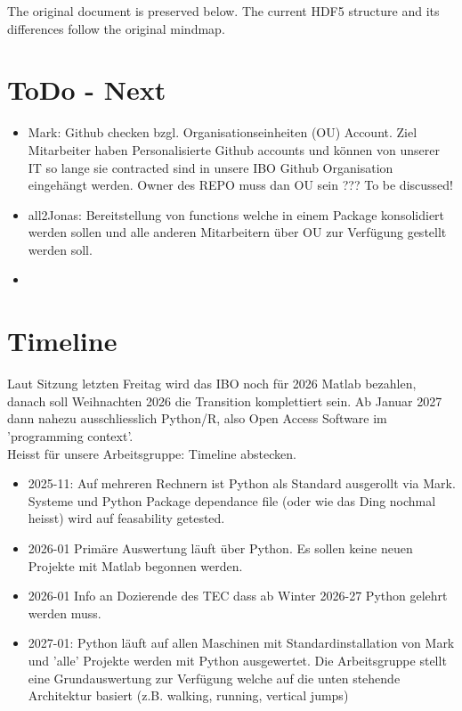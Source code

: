 \documentclass{article}
\begin{document}
The original document is preserved below. The current HDF5 structure and
its differences follow the original mindmap.




\section{ToDo - Next}
\begin{itemize}
    \item Mark: Github checken bzgl. Organisationseinheiten (OU) Account. Ziel Mitarbeiter haben Personalisierte Github accounts und können von unserer IT so lange sie contracted sind in unsere IBO Github Organisation eingehängt werden. Owner des REPO muss dan OU sein ??? To be discussed!
    \item all2Jonas: Bereitstellung von functions welche in einem Package konsolidiert werden sollen und alle anderen Mitarbeitern über OU zur Verfügung gestellt werden soll. 
    \item 
\end{itemize}



\section{Timeline}
Laut Sitzung letzten Freitag wird das IBO noch für 2026 Matlab bezahlen, danach soll Weihnachten 2026 die Transition komplettiert sein. Ab Januar 2027 dann nahezu ausschliesslich Python/R, also Open Access Software im 'programming context'.\\
Heisst für unsere Arbeitsgruppe: Timeline abstecken.

\begin{itemize}
    \item 2025-11: Auf mehreren Rechnern ist Python als Standard ausgerollt via Mark. Systeme und Python Package dependance file (oder wie das Ding nochmal heisst) wird auf feasability getested. 
    \item 2026-01 Primäre Auswertung läuft über Python. Es sollen keine neuen Projekte mit Matlab begonnen werden.
    \item  2026-01 Info an Dozierende des TEC dass ab Winter 2026-27 Python gelehrt werden muss.
    \item 2027-01: Python läuft auf allen Maschinen mit Standardinstallation von Mark und 'alle' Projekte werden mit Python ausgewertet. Die Arbeitsgruppe stellt eine Grundauswertung zur Verfügung welche auf die unten stehende Architektur basiert (z.B. walking, running, vertical jumps)  
\end{itemize}
\end{document}

